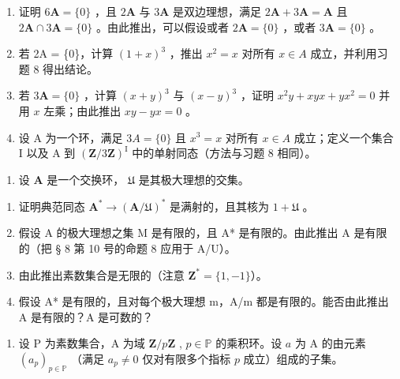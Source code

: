 \begin{enumerate}
\def\labelenumi{(\alph{enumi})}
\item
  证明 \(6\mathbf{A} = \{0\}\) ，且 \(2\mathbf{A}\) 与 \(3\mathbf{A}\) 是双边理想，满足 \(2\mathbf{A} + 3\mathbf{A} = \mathbf{A}\) 且 \(2\mathbf{A} \cap 3\mathbf{A} = \{0\}\) 。由此推出，可以假设或者 \(2\mathbf{A} = \{0\}\) ，或者 \(3\mathbf{A} = \{0\}\) 。
\item
  若 2A = \{0\}，计算 \((1 + x)^{3}\) ，推出 \(x^{2} = x\) 对所有 \(x \in A\) 成立，并利用习题 8 得出结论。
\item
  若 \(3\mathbf{A} = \{0\}\) ，计算 \((x + y)^3\) 与 \((x - y)^3\) ，证明 \(x^2y + xyx + yx^2 = 0\) 并用 \(x\) 左乘；由此推出 \(xy - yx = 0\) 。
\item
  设 A 为一个环，满足 \(3A = \{0\}\) 且 \(x^{3} = x\) 对所有 \(x \in A\) 成立；定义一个集合 I 以及 A 到 \((\mathbf{Z}/3\mathbf{Z})^{\mathrm{I}}\) 中的单射同态（方法与习题 8 相同）。
\end{enumerate}

\begin{enumerate}
\def\labelenumi{\arabic{enumi}.}
\setcounter{enumi}{9}
\tightlist
\item
  设 \(\mathbf{A}\) 是一个交换环， \(\mathfrak{U}\) 是其极大理想的交集。
\end{enumerate}

\begin{enumerate}
\def\labelenumi{(\alph{enumi})}
\item
  证明典范同态 \(\mathbf{A}^* \to (\mathbf{A} / \mathfrak{U})^*\) 是满射的，且其核为 \(1 + \mathfrak{U}\) 。
\item
  假设 A 的极大理想之集 M 是有限的，且 A* 是有限的。由此推出 A 是有限的（把 § 8 第 10 号的命题 8 应用于 A/U）。
\item
  由此推出素数集合是无限的（注意 \(\mathbf{Z}^{*} = \{1, -1\}\)）。
\item
  假设 A* 是有限的，且对每个极大理想 m，A/m 都是有限的。能否由此推出 A 是有限的？A 是可数的？
\end{enumerate}

\begin{enumerate}
\def\labelenumi{\arabic{enumi}.}
\setcounter{enumi}{10}
\tightlist
\item
  设 P 为素数集合，A 为域 \(\mathbf{Z} / p\mathbf{Z}\) , \(p \in \mathbb{P}\) 的乘积环。设 \(a\) 为 A 的由元素 \((a_p)_{p \in \mathbb{P}}\) （满足 \(a_p \neq 0\) 仅对有限多个指标 \(p\) 成立）组成的子集。
\end{enumerate}

